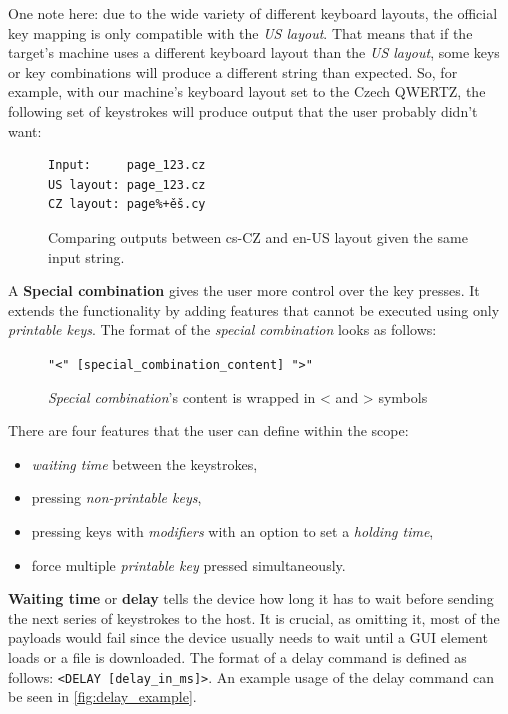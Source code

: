 One note here: due to the wide variety of different keyboard layouts, the official key mapping is only compatible with the \emph{US layout}. That means that if the target's machine uses a different keyboard layout than the \emph{US layout}, some keys or key combinations will produce a different string than expected. So, for example, with our machine's keyboard layout set to the Czech QWERTZ, the following set of keystrokes will produce output that the user probably didn't want:
\begin{figure}[ht]
\label{fig:layout_comparison}
\centering
\begin{varwidth}{\linewidth}
\begin{verbatim}
Input:     page_123.cz
US layout: page_123.cz
CZ layout: page%+ěš.cy
\end{verbatim}
\end{varwidth}
\caption{Comparing outputs between cs-CZ and en-US layout given the same input string.}
\end{figure}

A \textbf{Special combination} gives the user more control over the key presses. It extends the functionality by adding features that cannot be executed using only \emph{printable keys}. The format of the \emph{special combination} looks as follows:

\begin{figure}[ht]
\label{fig:format_special}
\centering
\begin{varwidth}{\linewidth}
\verb|"<" [special_combination_content] ">"|
\end{varwidth}
\caption{\emph{Special combination}'s content is wrapped in < and > symbols}
\end{figure}

There are four features that the user can define within the scope:
\begin{itemize}
    \item \emph{waiting time} between the keystrokes,
    \item pressing \emph{non-printable keys},
    \item pressing keys with \emph{modifiers} with an option to set a \emph{holding time},
    \item force multiple \emph{printable key} pressed simultaneously.
\end{itemize}

\textbf{Waiting time} or \textbf{delay} tells the device how long it has to wait before sending the next series of keystrokes to the host. It is crucial, as omitting it, most of the payloads would fail since the device usually needs to wait until a GUI element loads or a file is downloaded. The format of a delay command is defined as follows: \verb|<DELAY [delay_in_ms]>|. An example usage of the delay command can be seen in \autoref{fig:delay_example}.

